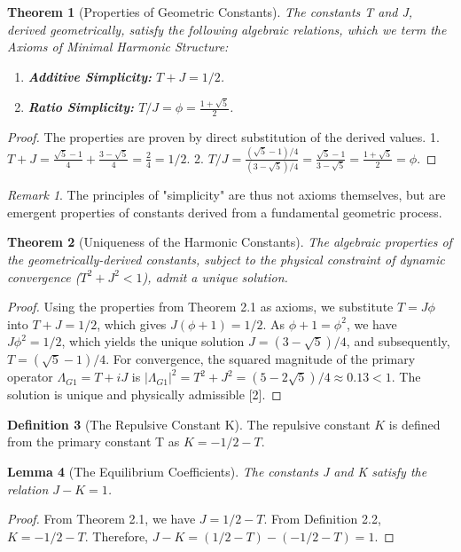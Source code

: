 \documentclass{article}
\theoremstyle{plain}
\newtheorem{theorem}{Theorem}[section]
\newtheorem{lemma}[theorem]{Lemma}
\theoremstyle{definition}
\newtheorem{definition}[theorem]{Definition}
\theoremstyle{remark}
\newtheorem*{remark}{Remark}
\begin{document}
\begin{theorem}[Properties of Geometric Constants]
The constants T and J, derived geometrically, satisfy the following algebraic relations, which we term the Axioms of Minimal Harmonic Structure:
\begin{enumerate}
    \item \textbf{Additive Simplicity:} $T+J = 1/2$.
    \item \textbf{Ratio Simplicity:} $T/J = \phi = \frac{1+\sqrt{5}}{2}$.
\end{enumerate}
\end{theorem}
\begin{proof}
The properties are proven by direct substitution of the derived values.
1. $T+J = \frac{\sqrt{5}-1}{4} + \frac{3-\sqrt{5}}{4} = \frac{2}{4} = 1/2$.
2. $T/J = \frac{(\sqrt{5}-1)/4}{(3-\sqrt{5})/4} = \frac{\sqrt{5}-1}{3-\sqrt{5}} = \frac{1+\sqrt{5}}{2} = \phi$.
\end{proof}

\begin{remark}
The principles of "simplicity" are thus not axioms themselves, but are emergent properties of constants derived from a fundamental geometric process.
\end{remark}

\begin{theorem}[Uniqueness of the Harmonic Constants]
The algebraic properties of the geometrically-derived constants, subject to the physical constraint of dynamic convergence ($T^2+J^2 < 1$), admit a unique solution.
\end{theorem}
\begin{proof}
Using the properties from Theorem 2.1 as axioms, we substitute $T=J\phi$ into $T+J=1/2$, which gives $J(\phi+1)=1/2$. As $\phi+1=\phi^2$, we have $J\phi^2=1/2$, which yields the unique solution $J=(3-\sqrt{5})/4$, and subsequently, $T=(\sqrt{5}-1)/4$. For convergence, the squared magnitude of the primary operator $\Lambda_{G1} = T+iJ$ is $|\Lambda_{G1}|^2 = T^2+J^2 = (5-2\sqrt{5})/4 \approx 0.13 < 1$. The solution is unique and physically admissible [2].
\end{proof}

\begin{definition}[The Repulsive Constant K]
The repulsive constant $K$ is defined from the primary constant T as $K = -1/2 - T$.
\end{definition}

\begin{lemma}[The Equilibrium Coefficients]
The constants J and K satisfy the relation $J-K=1$.
\end{lemma}
\begin{proof}
From Theorem 2.1, we have $J = 1/2 - T$. From Definition 2.2, $K = -1/2 - T$.
Therefore, $J-K = (1/2 - T) - (-1/2 - T) = 1$.
\end{proof}
\end{document}
